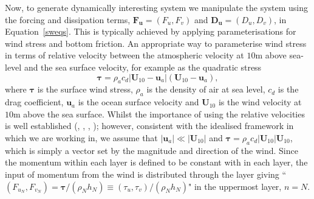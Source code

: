 \documentclass[12pt,a4paper]{report}
\newcommand*\equref[1]{Equation~\eqref{#1}}
\begin{document}
  Now, to generate dynamically interesting system we manipulate the system using 
  the forcing and
  dissipation terms, $\boldsymbol{F}_{\boldsymbol{u}} = \left(F_{u}, F_{v}\right)$ and $\boldsymbol{D}_{\boldsymbol{u}} = \left(D_{u}, D_{v}\right)$, in \equref{sweqs}.
  This is typically achieved by applying parameterisations for wind stress
  and bottom friction. An appropriate way to parameterise wind stress in terms of  
  relative velocity between the atmospheric velocity at $10 \mathrm{m}$ above sea-level
  and the sea surface velocity, for example as the quadratic stress
  \begin{equation}
  \boldsymbol{\tau}=\rho_{a} c_{d} \left|\boldsymbol{U}_{10}-\boldsymbol{u}_{a}\right|
  \left(\boldsymbol{U}_{10}-\boldsymbol{u}_{a}\right),
  \end{equation}
  where $\boldsymbol{\tau}$ is the surface wind stress, $\rho_{a}$ is the density of
  air at sea level, $c_{d}$ is the drag coefficient, $\boldsymbol{u}_{a}$ is the ocean
  surface velocity and $\boldsymbol{U}_{10}$ is the wind velocity
  at $10 \mathrm{m}$ above the sea surface.
  Whilst the importance of using the relative velocities is well established
  (\cite{duhaut2006wind}, \cite{zhai2007wind}, \cite{hughes2008wind}, \cite{zhai2012wind}); 
  however, consistent with the idealised framework in which we are 
  working in, we assume that $\left|\boldsymbol{u}_{a}\right| \ll \left|\boldsymbol{U}_{10}\right|$
  and $\boldsymbol{\tau}=\rho_{a} c_{d} \left|\boldsymbol{U}_{10}\right|
  \boldsymbol{U}_{10}$, which is simply a vector set by the 
  magnitude and direction of the wind.
   Since the momentum within each layer
  is defined to be constant with in each layer, the input of momentum from the wind
  is distributed through the layer giving ``$\left(F_{u_{N}},F_{v_{N}}\right)=\boldsymbol{\tau}/\left(\rho_{N}h_{N}\right) \equiv
  \left(\tau_{u},\tau_{v}\right)/\left(\rho_{N}h_{N}\right) $" in the
  uppermost layer, $n=N$. 
  
\end{document}
